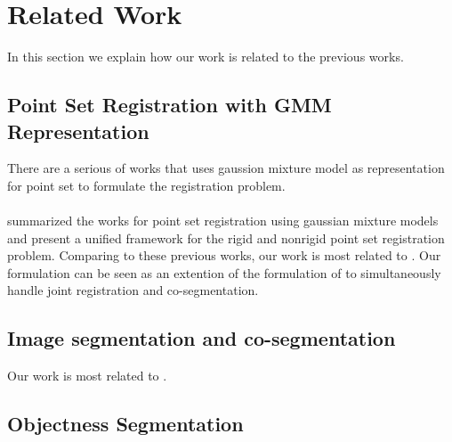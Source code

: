 \section{Related Work}
\label{sec:rw}
In this section we explain how our work is related to the previous works.
\subsection{Point Set Registration with GMM Representation}
\label{subsec:gmmreg}
There are a serious of works that uses gaussion mixture model as representation for point set to formulate the registration problem.
\cite{TPS_RPM}\\
\cite{CPD}\\
\cite{GMM_PAMI} summarized the works for point set registration
using gaussian mixture models and present a unified framework for the rigid and nonrigid point set registration problem.
Comparing to these previous works, our work is most related to \cite{Evangelidis2014}. Our formulation can be seen as an extention of the formulation of \cite{Evangelidis2014} to simultaneously handle joint registration and co-segmentation.
\subsection{Image segmentation and co-segmentation}
\label{subsec:coseg}
\cite{grabcut}
Our work is most related to \cite{Taniai_2016_CVPR}.

\subsection{Objectness Segmentation}
\label{subsec:objectness}
\cite{3DReasoningfromBlockstoStability}
\cite{pixelobjectness}